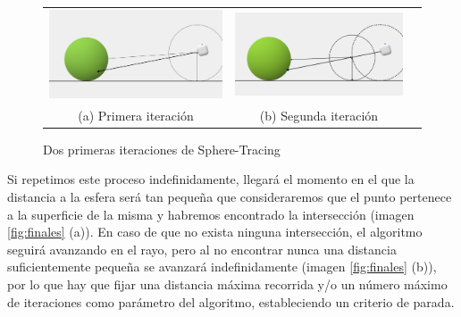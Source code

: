 \begin{figure}[ht]
    \centering
    \begin{tabular}{ccc}
      \includegraphics[scale=0.16]{img/C8/sphere-tracing-1.png} &     \includegraphics[scale=0.196]{img/C8/sphere-tracing-2.png} \\
    (a) Primera iteración & (b) Segunda iteración \\[6pt]
    \end{tabular}
    \caption{Dos primeras iteraciones de Sphere-Tracing}
    \label{fig:iteraciones-ST}
\end{figure}

Si repetimos este proceso indefinidamente, llegará el momento en el que la distancia a la esfera será tan pequeña que consideraremos que el punto pertenece a la superficie de la misma y habremos encontrado la intersección (imagen \ref{fig:finales} (a)). En caso de que no exista ninguna intersección, el algoritmo seguirá avanzando en el rayo, pero al no encontrar nunca una distancia suficientemente pequeña se avanzará indefinidamente (imagen \ref{fig:finales} (b)), por lo que hay que fijar una distancia máxima recorrida y/o un número máximo de iteraciones como parámetro del algoritmo, estableciendo un criterio de parada.

